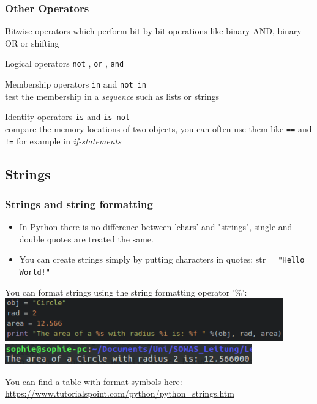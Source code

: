 \documentclass{beamer}
\begin{document}
\begin{frame}
\frametitle{Other Operators}
	\begin{alertblock}{Bitwise operators} 
		which perform bit by bit operations like binary AND, binary OR or shifting
	\end{alertblock}
	\begin{alertblock}{Logical operators} 
		\texttt{not} , \texttt{or} , \texttt{and} \\
	\end{alertblock}
	\begin{alertblock} {Membership operators} 
		\texttt{in} and \texttt{not in} \\test the membership in a \textit{sequence} such as lists or strings
	\end{alertblock}
	\begin{alertblock}{Identity operators} 
		\texttt{is} and \texttt{is not} \\compare the memory locations of two objects, you can often use them like \texttt{==} and \texttt{!=}	for example in \textit{if-statements}
	\end{alertblock}
\end{frame}

\subsection{Strings}

\begin{frame}
\frametitle{Strings and string formatting}
	\begin{itemize}
		\item In Python there is no difference between 'chars' and "strings", single and double quotes are treated the same.
		\item You can create strings simply by putting characters in quotes: str = \texttt{"Hello World!"}
	\end{itemize}
	You can format strings using the string formatting operator '\%': \\
	\includegraphics[width = 0.9\textwidth]{StringFormat.pdf} \\
	\includegraphics[width = 0.8\textwidth]{StringFormatOutput.pdf}
	
	You can find a table with format symbols here: \url{https://www.tutorialspoint.com/python/python_strings.htm}
\end{frame}
\end{document}
